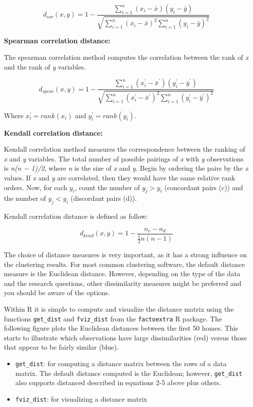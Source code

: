 \documentclass[]{book}
\providecommand{\tightlist}{%
  \setlength{\itemsep}{0pt}\setlength{\parskip}{0pt}}
\theoremstyle{definition}
\theoremstyle{definition}
\theoremstyle{definition}
\theoremstyle{remark}
\begin{document}
\[d_{cor}(x, y) = 1 - \frac{\sum^n_{i=1}(x_i-\bar x)(y_i - \bar y)}{\sqrt{\sum^n_{i=1}(x_i-\bar x)^2\sum^n_{i=1}(y_i - \bar y)^2}} \tag{3}\]

\textbf{Spearman correlation distance:}

The spearman correlation method computes the correlation between the
rank of \emph{x} and the rank of \emph{y} variables.

\[d_{spear}(x, y) = 1 - \frac{\sum^n_{i=1}(x^\prime_i-\bar x^\prime)(y^\prime_i - \bar y^\prime)}{\sqrt{\sum^n_{i=1}(x^\prime_i-\bar x^\prime)^2\sum^n_{i=1}(y^\prime_i - \bar y^\prime)^2}} \tag{4}\]

Where \(x^\prime_i = rank(x_i)\) and \(y^\prime_i = rank(y_i)\).

\textbf{Kendall correlation distance:}

Kendall correlation method measures the correspondence between the
ranking of \emph{x} and \emph{y} variables. The total number of possible
pairings of \emph{x} with \emph{y} observations is \emph{n(n − 1)/2},
where \emph{n} is the size of \emph{x} and \emph{y}. Begin by ordering
the pairs by the \emph{x} values. If \emph{x} and \emph{y} are
correlated, then they would have the same relative rank orders. Now, for
each \(y_i\), count the number of \(y_j > y_i\) (concordant pairs (c))
and the number of \(y_j < y_i\) (discordant pairs (d)).

Kendall correlation distance is defined as follow:

\[d_{kend}(x,y) = 1 - \frac{n_c - n_d}{\frac{1}{2}n(n - 1)} \tag{5}\]

The choice of distance measures is very important, as it has a strong
influence on the clustering results. For most common clustering
software, the default distance measure is the Euclidean distance.
However, depending on the type of the data and the research questions,
other dissimilarity measures might be preferred and you should be aware
of the options.

Within R it is simple to compute and visualize the distance matrix using
the functions \texttt{get\_dist} and \texttt{fviz\_dist} from the
\texttt{factoextra} R package. The following figure plots the Euclidean
distances between the first 50 homes. This starts to illustrate which
observations have large dissimilarities (red) versus those that appear
to be fairly similar (blue).

\begin{itemize}
\tightlist
\item
  \texttt{get\_dist}: for computing a distance matrix between the rows
  of a data matrix. The default distance computed is the Euclidean;
  however, \texttt{get\_dist} also supports distanced described in
  equations 2-5 above plus others.
\item
  \texttt{fviz\_dist}: for visualizing a distance matrix
\end{itemize}
\end{document}
